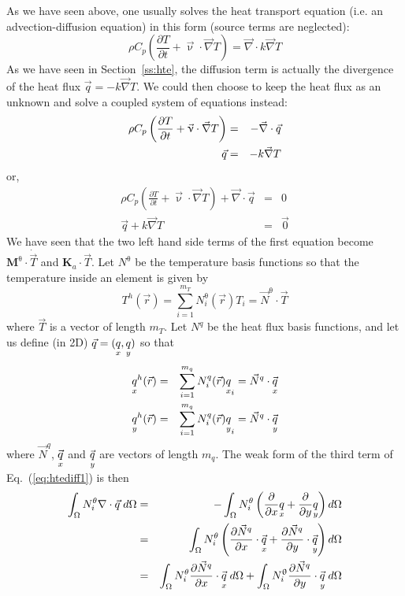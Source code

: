 
As we have seen above, one usually solves the heat transport equation (i.e. 
an advection-diffusion equation) in this form (source terms are neglected):
\begin{equation}
\rho C_p \left( \frac{\partial T}{\partial t} + {\vec \upnu}\cdot {\vec\nabla T} \right)
= {\vec \nabla} \cdot k \vec\nabla T 
\end{equation}
As we have seen in Section~\ref{ss:hte}, the diffusion term is actually the divergence of the heat flux
$\vec{q}=-k \vec \nabla T$. We could then choose to keep the heat flux as an unknown and 
solve a coupled system of equations instead:
\begin{eqnarray}
\rho C_p \left( \frac{\partial T}{\partial t} + {\vec \upnu}\cdot {\vec\nabla T} \right)
&=& - {\vec \nabla} \cdot \vec{q} \nonumber\\ 
\vec{q} &=& - k \vec \nabla T \nonumber
\end{eqnarray}
or, 
\begin{eqnarray}
\rho C_p \left( \frac{\partial T}{\partial t} + {\vec \upnu}\cdot {\vec\nabla T} \right)
+ {\vec \nabla} \cdot \vec{q} &=& 0 \label{eq:htediff1}\\ 
\vec{q} + k \vec \nabla T &=& \vec{0} \label{eq:htediff2}
\end{eqnarray}
We have seen that the two left hand side terms of the first equation become 
${\bm M}^\uptheta \cdot \dot{\vec{T}}$ and ${\bm K}_a \cdot \vec{T}$.
Let $N^\uptheta$ be the temperature basis functions so that the temperature inside an element is 
given by
\begin{equation}
T^h({\vec r}) = \sum_{i=1}^{m_T} N^\uptheta_i ({\vec r}) T_i = \vec N^\uptheta \cdot \vec T
\end{equation}
where $\vec T$ is a vector of length $m_T$.
Let $N^q$ be the heat flux basis functions, and let us define (in 2D) $\vec{q}=(\underset{\tiny x}{q},\underset{\tiny y}{q})$ so that 
\begin{eqnarray}
\underset{\tiny x}{q}^h({\vec r}) &=& \sum_{i=1}^{m_q} N^q_i ({\vec r}) \underset{\tiny x}{q}_i = \vec{N}^q \cdot \vec{\underset{\tiny x}{q}} \\
\underset{\tiny y}{q}^h({\vec r}) &=& \sum_{i=1}^{m_q} N^q_i ({\vec r}) \underset{\tiny y}{q}_i = \vec{N}^q \cdot \vec{\underset{\tiny y}{q}} 
\end{eqnarray}
where $\vec{N}^q$, $\vec{\underset{\tiny x}{q}}$ and $\vec{\underset{\tiny y}{q}}$ are vectors of length $m_q$.
The weak form of the third term of Eq.~(\ref{eq:htediff1}) is then
\begin{eqnarray}
\int_\Omega N_i^\theta  \nabla \cdot \vec{q} \;  d\Omega
&=& -\int_\Omega N_i^\theta  
\left(  \frac{\partial }{\partial x}\underset{\tiny x}{q} + \frac{\partial }{\partial y}\underset{\tiny y}{q} \right) d\Omega \nonumber\\
&=& \int_\Omega N_i^\theta  \left(  \frac{\partial \vec{N}^q}{\partial x}\cdot \vec{\underset{\tiny x}{q}}
+  \frac{\partial \vec{N}^q}{\partial y}\cdot \vec{\underset{\tiny y}{q}} \right) d\Omega \nonumber\\
&=& \int_\Omega N_i^\theta  \frac{\partial \vec{N}^q}{\partial x}\cdot  \vec{\underset{\tiny x}{q}} \;  d\Omega + 
\int_\Omega  N_i^\uptheta \frac{\partial \vec{N}^q}{\partial y} \cdot \vec{\underset{\tiny y}{q}} \;  d\Omega \nonumber
\end{eqnarray}
